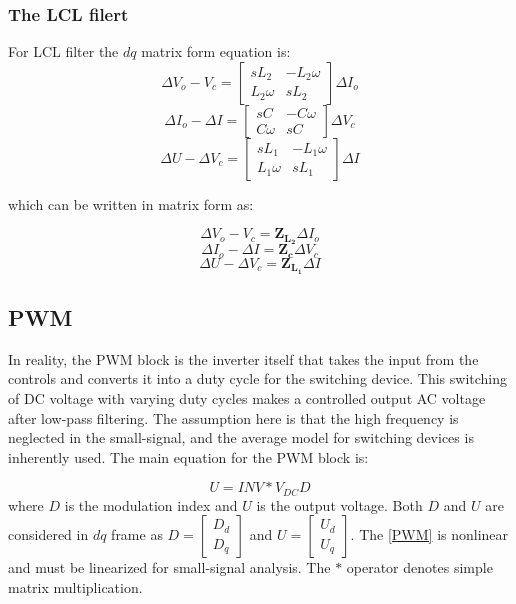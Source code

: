 \subsubsection{The LCL filert}
For LCL filter the $dq$ matrix form equation is:
\begin{equation}
\Delta V_o - V_c= \begin{bmatrix} sL_2 & -L_2\omega \\ L_2\omega & sL_2\end{bmatrix} \Delta I_o
\end{equation}
\begin{equation}
 \Delta I_o-\Delta I = \begin{bmatrix} sC & -C\omega \\ C\omega & sC\end{bmatrix}\Delta V_c 
\end{equation}
\begin{equation}
 \Delta U-\Delta V_c = \begin{bmatrix} sL_1 & -L_1\omega \\ L_1\omega & sL_1\end{bmatrix}\Delta I 
\end{equation}

which can be written in matrix form as:

\begin{equation}
\Delta V_o - V_c=\mathbf{\mathbf{Z_L_2} } \Delta I_o
\end{equation}
\begin{equation}
 \Delta I_o-\Delta I = \mathbf{Z_c } \Delta V_c 
\end{equation}
\begin{equation}
 \Delta U-\Delta V_c = \mathbf{Z_L_1 } \Delta I 
\end{equation}

\subsection{\gls{PWM}}

In reality, the PWM block is the inverter itself that takes the input from the controls and converts it into a duty cycle for the switching device. This switching of DC voltage with varying duty cycles makes a controlled output AC voltage after low-pass filtering. The assumption here is that the high frequency is neglected in the small-signal, and the average model for switching devices is inherently used. The main equation for the PWM block is: 

\begin{equation}\label{PWM}
 U=INV*V_{DC}D
\end{equation}
where $D$ is the modulation index and $U$ is the output voltage. Both $D$ and $U$ are considered in $dq$ frame as $D=\begin{bmatrix}D_d \\ D_q \end{bmatrix}$ and $U=\begin{bmatrix}U_d \\ U_q \end{bmatrix}$. The \ref{PWM} is nonlinear and must be linearized for small-signal analysis. The $*$ operator denotes simple matrix multiplication.


